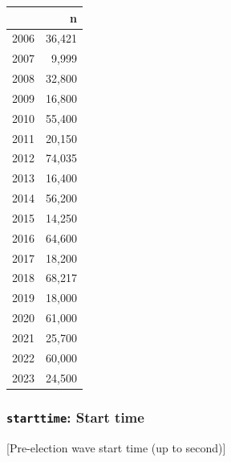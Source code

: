 \documentclass[10pt,article,oneside]{memoir}
\theoremstyle{definition}
\begin{document}
\begin{table}[H]
\centering
\begin{tabular}[t]{lr}
\toprule
 & n\\
\midrule
2006 & 36,421\\
2007 & 9,999\\
2008 & 32,800\\
2009 & 16,800\\
2010 & 55,400\\
2011 & 20,150\\
2012 & 74,035\\
2013 & 16,400\\
2014 & 56,200\\
2015 & 14,250\\
2016 & 64,600\\
2017 & 18,200\\
2018 & 68,217\\
2019 & 18,000\\
2020 & 61,000\\
2021 & 25,700\\
2022 & 60,000\\
2023 & 24,500\\
\bottomrule
\end{tabular}
\end{table}

\subsubsection{\texorpdfstring{\texttt{starttime}: Start
time}{starttime: Start time}}\label{starttime-start-time}

{[}Pre-election wave start time (up to second){]}
\end{document}
